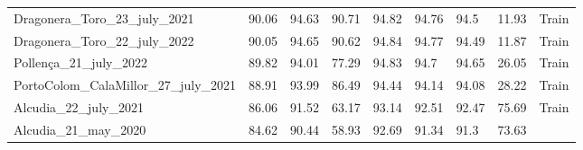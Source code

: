 \begin{table}[H]
{\begin{tabular}{lllllllll}
            \\
            Dragonera\_Toro\_23\_july\_2021        & 90.06               &
            94.63
                                                   & 90.71               &
            94.82
                                                   & 94.76               & 94.5
                                                   & 11.93               &
            {\color[HTML]{66c2a5} Train}
            \\
            Dragonera\_Toro\_22\_july\_2022        & 90.05               &
            94.65
                                                   & 90.62               &
            94.84
                                                   & 94.77               &
            94.49
                                                   & 11.87               &
            {\color[HTML]{66c2a5} Train}
            \\
            Pollença\_21\_july\_2022               & 89.82               &
            94.01
                                                   & 77.29               &
            94.83
                                                   & 94.7                &
            94.65
                                                   & 26.05               &
            {\color[HTML]{66c2a5} Train}
            \\
            PortoColom\_CalaMillor\_27\_july\_2021 & 88.91               &
            93.99
                                                   & 86.49               &
            94.44
                                                   & 94.14               &
            94.08
                                                   & 28.22               &
            {\color[HTML]{66c2a5} Train}
            \\
            Alcudia\_22\_july\_2021                & 86.06               &
            91.52
                                                   & 63.17               &
            93.14
                                                   & 92.51               &
            92.47
                                                   & 75.69               &
            {\color[HTML]{66c2a5} Train}
            \\
            Alcudia\_21\_may\_2020                 & 84.62               &
            90.44
                                                   & 58.93               &
            92.69
                                                   & 91.34               & 91.3
                                                   & 73.63               &

\end{tabular}}
\end{table}

